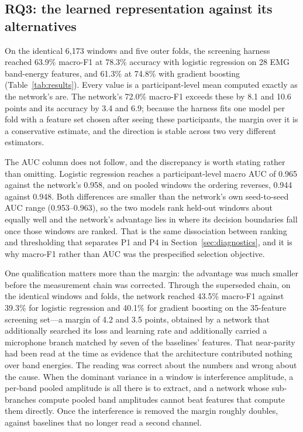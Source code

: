 \documentclass[pdflatex,sn-nature,iicol]{sn-jnl}
\begin{document}
\subsection{RQ3: the learned representation against its alternatives}
\label{sec:rq3}

On the identical 6,173 windows and five outer folds, the screening harness reached 63.9\% macro-F1 at 78.3\% accuracy with logistic regression on 28 EMG band-energy features, and 61.3\% at 74.8\% with gradient boosting (Table~\ref{tab:results}). Every value is a participant-level mean computed exactly as the network's are. The network's 72.0\% macro-F1 exceeds these by 8.1 and 10.6 points and its accuracy by 3.4 and 6.9; because the harness fits one model per fold with a feature set chosen after seeing these participants, the margin over it is a conservative estimate, and the direction is stable across two very different estimators.

The AUC column does not follow, and the discrepancy is worth stating rather than omitting. Logistic regression reaches a participant-level macro AUC of 0.965 against the network's 0.958, and on pooled windows the ordering reverses, 0.944 against 0.948. Both differences are smaller than the network's own seed-to-seed AUC range (0.953--0.963), so the two models rank held-out windows about equally well and the network's advantage lies in where its decision boundaries fall once those windows are ranked. That is the same dissociation between ranking and thresholding that separates P1 and P4 in Section~\ref{sec:diagnostics}, and it is why macro-F1 rather than AUC was the prespecified selection objective.

One qualification matters more than the margin: the advantage was much smaller before the measurement chain was corrected. Through the superseded chain, on the identical windows and folds, the network reached 43.5\% macro-F1 against 39.3\% for logistic regression and 40.1\% for gradient boosting on the 35-feature screening set---a margin of 4.2 and 3.5 points, obtained by a network that additionally searched its loss and learning rate and additionally carried a microphone branch matched by seven of the baselines' features. That near-parity had been read at the time as evidence that the architecture contributed nothing over band energies. The reading was correct about the numbers and wrong about the cause. When the dominant variance in a window is interference amplitude, a per-band pooled amplitude is all there is to extract, and a network whose sub-branches compute pooled band amplitudes cannot beat features that compute them directly. Once the interference is removed the margin roughly doubles, against baselines that no longer read a second channel.
\end{document}

